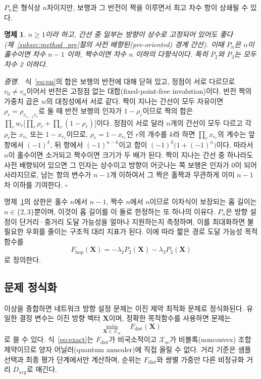 \documentclass[twocolumn,a4paper]{article}
\newtheorem{proposition}[theorem]{명제}
\newenvironment{proof}{\par\noindent\textit{증명.}\ }{\hfill\(\square\)\par\medskip}
\begin{document}
\(P_n\)은 형식상 \(n\)차이지만, 보행과 그 반전이 짝을 이루면서 최고 차수 항이 상쇄될 수 있다.

\begin{proposition} \label{prop:deg}
\(n\geq1\)이라 하고, 간선 중 일부는 방향이 상수로 고정되어 있어도 좋다(제~\ref{subsec:method_pre}절의 사전 배향된(pre-oriented) 경계 간선). 이때 \(P_n\)은 \(n\)이 홀수이면 차수 \(n-1\) 이하, 짝수이면 차수 \(n\) 이하의 다항식이다. 특히 \(P_2\)와 \(P_3\)는 모두 차수 2 이하다.
\end{proposition}

\begin{proof}
식~\eqref{eq:pn}의 합은 보행의 반전에 대해 닫혀 있고, 정점이 서로 다르므로 \(v_0\neq v_n\)이어서 반전은 고정점 없는 대합(fixed-point-free involution)이다. 반전 짝의 가중치 곱은 \(w\)의 대칭성에서 서로 같다. 짝이 지나는 간선이 모두 자유이면 \(\rho_r=\rho_{v_{r-1}v_r}\)로 둘 때 반전 보행의 인자가 \(1-\rho_r\)이므로 짝의 합은 \(\prod_rw_r\bigl[\prod_r\rho_r+\prod_r(1-\rho_r)\bigr]\)이다. 정점이 서로 달라 \(n\)개의 간선이 모두 다르고 각 \(\rho_r\)는 \(x_{e_r}\) 또는 \(1-x_{e_r}\)이므로, \(\rho_r=1-x_{e_r}\)인 \(r\)의 개수를 \(k\)라 하면 \(\prod_rx_{e_r}\)의 계수는 앞 항에서 \((-1)^k\), 뒤 항에서 \((-1)^{n-k}\)이고 합이 \((-1)^k\bigl(1+(-1)^n\bigr)\)이다. 따라서 \(n\)이 홀수이면 소거되고 짝수이면 크기가 두 배가 된다. 짝이 지나는 간선 중 하나라도 사전 배향되어 있으면 그 인자는 상수이고 방향이 어긋나는 쪽 보행은 인자가 0이 되어 사라지므로, 남는 항의 변수가 \(n-1\)개 이하여서 그 짝은 홀짝과 무관하게 이미 \(n-1\)차 이하를 기여한다.
\end{proof}

명제~\ref{prop:deg}의 상한은 홀수 \(n\)에서 \(n-1\), 짝수 \(n\)에서 \(n\)이므로 이차식이 보장되는 홉 길이는 \(n\in\{2,3\}\)뿐이며, 이것이 홉 길이를 이 둘로 한정하는 또 하나의 이유다. \(P_n\)은 방향 설정이 단거리·중거리 도달 가능성을 얼마나 지원하는지 측정하며, 이를 최대화하면 불필요한 우회를 줄이는 구조적 대리 지표가 된다. 이에 따라 짧은 경로 도달 가능성 목적함수를
\begin{equation}
F_{\mathrm{hop}}(\mathbf{X})=-\lambda_2P_2(\mathbf{X})-\lambda_3P_3(\mathbf{X})
\end{equation}
로 정의한다.

\subsection{문제 정식화}

이상을 종합하면 네트워크 방향 설정 문제는 이진 제약 최적화 문제로 정식화된다. 유일한 결정 변수는 이진 방향 벡터 \(\mathbf{X}\)이며, 정확한 목적함수를 사용하면 문제는
\begin{equation}
\min_{\mathbf{X}\in\mathcal{X}_{\mathrm{sc}}}\quad F_{\mathrm{dist}}(\mathbf{X})
\label{eq:exact}
\end{equation}
로 쓸 수 있다. 식~\eqref{eq:exact}는 \(F_{\mathrm{dist}}\)가 비국소적이고 \(\mathcal{X}_{\mathrm{sc}}\)가 비볼록(nonconvex) 조합 제약이므로 양자 어닐러(quantum annealer)에 직접 올릴 수 없다. 거리 기준은 샘플 선택과 최종 평가 단계에서만 계산하며, 순위는 \(F_{\mathrm{dist}}\)와 쌍별 가중만 다른 비정규화 거리 \(D_{\mathrm{avg}}\)로 매긴다.
\end{document}

